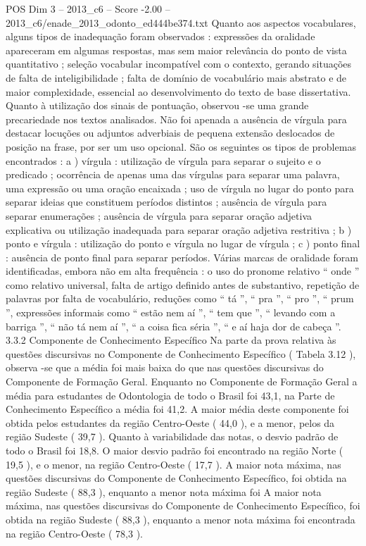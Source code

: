 \begin{textsample}{POS Dim 3 – 2013\_c6 – Score -2.00 – 2013\_c6/enade\_2013\_odonto\_ed444be374.txt}
Quanto aos aspectos vocabulares, alguns tipos de inadequação foram observados : expressões da oralidade apareceram em algumas respostas, mas sem maior relevância do ponto de vista quantitativo ; seleção vocabular incompatível com o contexto, gerando situações de falta de inteligibilidade ; falta de domínio de vocabulário mais abstrato e de maior complexidade, essencial ao desenvolvimento do texto de base dissertativa.
Quanto à utilização dos sinais de pontuação, observou -se uma grande precariedade nos textos analisados.
Não foi apenada a ausência de vírgula para destacar locuções ou adjuntos adverbiais de pequena extensão deslocados de posição na frase, por ser um uso opcional.
São os seguintes os tipos de problemas encontrados : a ) vírgula : utilização de vírgula para separar o sujeito e o predicado ; ocorrência de apenas uma das vírgulas para separar uma palavra, uma expressão ou uma oração encaixada ; uso de vírgula no lugar do ponto para separar ideias que constituem períodos distintos ; ausência de vírgula para separar enumerações ; ausência de vírgula para separar oração adjetiva explicativa ou utilização inadequada para separar oração adjetiva restritiva ; b ) ponto e vírgula : utilização do ponto e vírgula no lugar de vírgula ; c ) ponto final : ausência de ponto final para separar períodos.
Várias marcas de oralidade foram identificadas, embora não em alta frequência : o uso do pronome relativo “ onde ” como relativo universal, falta de artigo definido antes de substantivo, repetição de palavras por falta de vocabulário, reduções como “ tá ”, “ pra ”, “ pro ”, “ prum ”, expressões informais como “ estão nem aí ”, “ tem que ”, “ levando com a barriga ”, “ não tá nem aí ”, “ a coisa fica séria ”, “ e aí haja dor de cabeça ”. 3.3.2 Componente de Conhecimento Específico Na parte da prova relativa às questões discursivas no Componente de Conhecimento Específico ( Tabela 3.12 ), observa -se que a média foi mais baixa do que nas questões discursivas do Componente de Formação Geral.
Enquanto no Componente de Formação Geral a média para estudantes de Odontologia de todo o Brasil foi 43,1, na Parte de Conhecimento Específico a média foi 41,2.
A maior média deste componente foi obtida pelos estudantes da região Centro-Oeste ( 44,0 ), e a menor, pelos da região Sudeste ( 39,7 ).
Quanto à variabilidade das notas, o desvio padrão de todo o Brasil foi 18,8.
O maior desvio padrão foi encontrado na região Norte ( 19,5 ), e o menor, na região Centro-Oeste ( 17,7 ).
A maior nota máxima, nas questões discursivas do Componente de Conhecimento Específico, foi obtida na região Sudeste ( 88,3 ), enquanto a menor nota máxima foi A maior nota máxima, nas questões discursivas do Componente de Conhecimento Específico, foi obtida na região Sudeste ( 88,3 ), enquanto a menor nota máxima foi encontrada na região Centro-Oeste ( 78,3 ).

\end{textsample}
